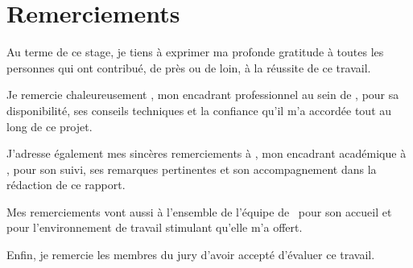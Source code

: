 \chapter*{Remerciements}
\thispagestyle{plain}

Au terme de ce stage, je tiens à exprimer ma profonde gratitude à toutes les personnes
qui ont contribué, de près ou de loin, à la réussite de ce travail.

Je remercie chaleureusement \textbf{\encadrantPro}, mon encadrant professionnel au sein
de \textbf{\entreprise}, pour sa disponibilité, ses conseils techniques et la confiance
qu'il m'a accordée tout au long de ce projet.

J'adresse également mes sincères remerciements à \textbf{\encadrantAca}, mon encadrant
académique à \ecole, pour son suivi, ses remarques pertinentes et son accompagnement
dans la rédaction de ce rapport.

Mes remerciements vont aussi à l'ensemble de l'équipe de \entreprise\ pour son accueil
et pour l'environnement de travail stimulant qu'elle m'a offert.

Enfin, je remercie les membres du jury d'avoir accepté d'évaluer ce travail.
